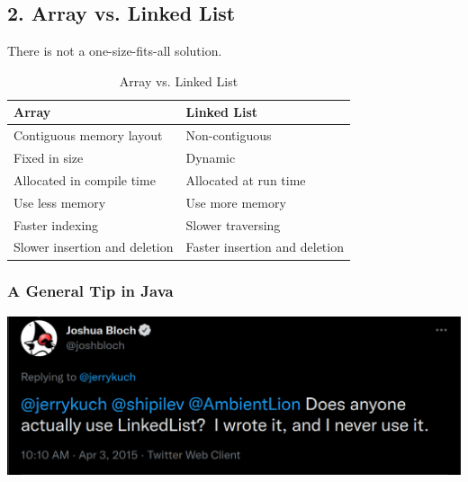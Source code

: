 \documentclass[aspectratio=169, 14pt]{beamer}
\begin{document}
\begin{frame}
	\section{\textcolor{darkmidnightblue}{2. Array vs. Linked List}}
	There is not a one-size-fits-all solution.

\end{frame}

\begin{frame}
	\begin{table}
		\caption*{Array vs. Linked List}
		\begin{tabular}{ll}
			\toprule
			Array                         & Linked List                   \\
			\midrule
			Contiguous memory layout      & Non-contiguous                \\
			Fixed in size                 & Dynamic                       \\
			Allocated in compile time     & Allocated at run time         \\
			Use less memory               & Use more memory               \\
			Faster indexing               & Slower traversing             \\
			Slower insertion and deletion & Faster insertion and deletion \\
			\bottomrule
		\end{tabular}
	\end{table}
\end{frame}

\begin{frame}
	\frametitle{A General Tip in Java}


	\pause
	\includegraphics[width=.85\textwidth]{week6/linked}

\end{frame}
\end{document}
